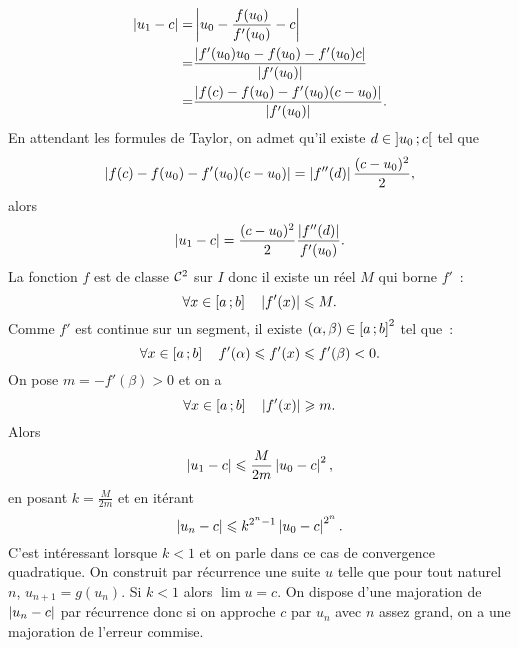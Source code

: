 \begin{align*}
  \left\lvert u_1-c\right\rvert = & \left\lvert u_0 - \frac{f(u_0)}{f'(u_0)} -c\right\rvert \\
  = & \frac{\left\lvert f'(u_0)u_0 - f(u_0) -f'(u_0)c\right\rvert}{\left\lvert f'(u_0)\right\rvert} \\
  = & \frac{\left\lvert f(c)-f(u_0)-f'(u_0)(c-u_0)\right\rvert}{\left\lvert f'(u_0)\right\rvert}.
\end{align*}
En attendant les formules de Taylor, on admet qu'il existe \(d \in 
\left] u_0 \, ;  c \right[\) tel que
\begin{equation}
  \left\lvert f(c)-f(u_0)-f'(u_0)(c-u_0)\right\rvert = \left\lvert f''(d)\right\rvert\frac{(c-u_0)^2}{2},
\end{equation}
alors
\begin{equation}
  \left\lvert u_1-c\right\rvert = \frac{(c-u_0)^2}{2} \frac{\left\lvert f''(d)\right\rvert}{f'(u_0)}.
\end{equation}
La fonction \(f\) est de classe \(\mathcal{C}^{2}\) sur \(I\) donc il existe un réel 
\(M\) qui borne \(f'\)~:
\begin{equation}
  \forall x \in \left[ a \, ;  b \right] \quad \left\lvert f'(x)\right\rvert \leqslant M.
\end{equation}
Comme \(f'\) est continue sur un segment, il existe \((\alpha,\beta) \in 
\left[ a \, ;  b \right]^2\) tel que~:
\begin{equation}
  \forall x \in \left[ a \, ;  b \right] \quad f'(\alpha) \leqslant f'(x) \leqslant 
  f'(\beta) <0.
\end{equation}
On pose \(m=-f'(\beta)>0\) et on a
\begin{equation}
  \forall x \in \left[ a \, ;  b \right] \quad \left\lvert f'(x)\right\rvert \geqslant m.
\end{equation}
Alors
\begin{equation}
  \left\lvert u_1-c\right\rvert \leqslant \frac{M}{2m} \left\lvert u_0-c\right\rvert^2,
\end{equation}
en posant \(k=\frac{M}{2m}\) et en itérant
\begin{equation}
  \left\lvert u_n-c\right\rvert \leqslant k^{2^n-1} \left\lvert u_0-c\right\rvert^{2^n}.
\end{equation}
C'est intéressant lorsque \(k < 1\) et on parle dans ce cas de convergence 
quadratique. On construit par récurrence une suite \(u\) telle que pour tout 
naturel \(n\), \(u_{n+1}=g(u_n)\). Si \(k<1\) alors \(\lim u =c\). On dispose 
d'une majoration de \(\left\lvert u_n-c\right\rvert\) par récurrence donc si on approche \(c\) par 
\(u_n\) avec \(n\) assez grand, on a une majoration de l'erreur commise.
